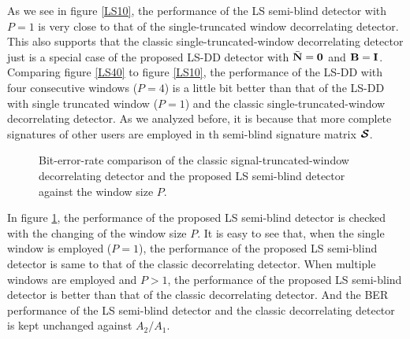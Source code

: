 \documentclass[a4paper,10pt,fleqn, twocolumn]{IEEETran}
\newcommand{\bN}{{\bf N}}
\newcommand{\bI}{{\bf I}}
\newcommand{\bB}{{\bf B}}
\newcommand{\bcS}{{\mbox {\boldmath ${\cal S}$}}}
\begin{document}
As we see in figure \ref{LS10}, the performance of the LS
semi-blind detector with $P=1$ is very close to that of the
single-truncated window decorrelating detector. This also supports
that the classic single-truncated-window decorrelating detector
just is a special case of the proposed LS-DD detector with
$\bar{\bN} = \mathbf{0}$ and $\bB=\bI$. Comparing figure
\ref{LS40} to figure \ref{LS10}, the performance of the LS-DD with
four consecutive windows ($P=4$) is a little bit better than that
of the LS-DD with single truncated window ($P=1$) and the classic
single-truncated-window decorrelating detector. As we analyzed
before, it is because that more complete signatures of other users
are employed in th semi-blind signature matrix $\bcS$.

\begin{figure}
\caption{Bit-error-rate comparison of the classic
signal-truncated-window decorrelating detector and the proposed LS
semi-blind detector against the window size $P$.} \label{P0}
\end{figure}

In figure \ref{P0}, the performance of the proposed LS semi-blind
detector is checked with the changing of the window size $P$. It
is easy to see that, when the single window is employed ($P=1$),
the performance of the proposed LS semi-blind detector is same to
that of the classic decorrelating detector. When multiple windows
are employed and $P>1$, the performance of the proposed LS
semi-blind detector is better than that of the classic
decorrelating detector. And the BER performance of the LS
semi-blind detector and the classic decorrelating detector is kept
unchanged against $A_2/A_1$.
\end{document}
